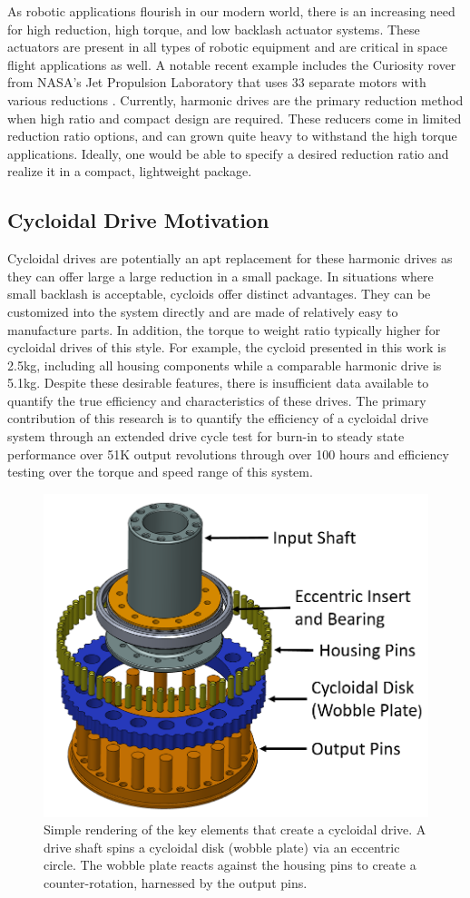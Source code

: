 
As robotic applications flourish in our modern world, there is an increasing need for  high reduction, high torque, and low backlash actuator systems. These actuators are present in all types of robotic equipment and are critical in space flight applications as well. A notable recent example includes the Curiosity rover from NASA's Jet Propulsion Laboratory that uses 33 separate motors with various reductions \cite{curiosity}. Currently, harmonic drives are the primary reduction method when high ratio and compact design are required. These reducers come in limited reduction ratio options, and can grown quite heavy to withstand the high torque applications. Ideally, one would be able to specify a desired reduction ratio and realize it in a compact, lightweight package.

\subsection{Cycloidal Drive Motivation}

Cycloidal drives are potentially an apt replacement for these harmonic drives as they can offer large a large reduction in a small package. In situations where small backlash is acceptable, cycloids offer distinct advantages. They can be customized into the system directly and are made of relatively easy to manufacture parts. In addition, the torque to weight ratio typically higher for cycloidal drives of this style. For example, the cycloid presented in this work is 2.5kg, including all housing components while a comparable harmonic drive is 5.1kg.
Despite these desirable features, there is insufficient data available to quantify the true efficiency and characteristics of these drives. 
The primary contribution of this research is to quantify the efficiency of a cycloidal drive system through an extended drive cycle test for burn-in to steady state performance over 51K output revolutions through over 100 hours and efficiency testing over the torque and speed range of this system. 

   \begin{figure}[!b]
      \centering
      \includegraphics[width=0.50\linewidth]{cycloid_cartoon_v2}
      \caption{Simple rendering of the key elements that create a cycloidal drive. A drive shaft spins a cycloidal disk (wobble plate) via an eccentric circle. The wobble plate reacts against the housing pins to create a counter-rotation, harnessed by the output pins.}
      \label{cycloid_cartoon}
   \end{figure}
   
